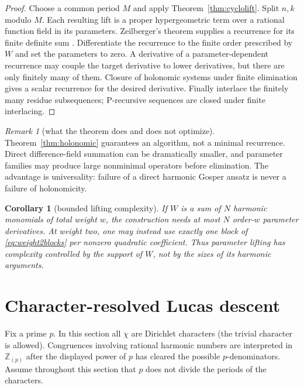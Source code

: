 \documentclass[11pt]{article}
\newtheorem{corollary}[theorem]{Corollary}
\theoremstyle{definition}
\theoremstyle{remark}
\newtheorem{remark}[theorem]{Remark}
\newcommand{\Zp}{\mathbb Z_{(p)}}
\begin{document}
\begin{proof}
Choose a common period $M$ and apply Theorem~\ref{thm:cyclolift}.  Split $n,k$ modulo $M$.
Each resulting lift is a proper hypergeometric term over a rational function field in its
parameters.  Zeilberger's theorem supplies a recurrence for its finite definite sum
\cite{WZ1990,PWZ}.  Differentiate the recurrence to the finite order prescribed by $W$
and set the parameters to zero.  A derivative of a parameter-dependent recurrence may
couple the target derivative to lower derivatives, but there are only finitely many of
them.  Closure of holonomic systems under finite elimination gives a scalar recurrence
for the desired derivative.  Finally interlace the finitely many residue subsequences;
P-recursive sequences are closed under finite interlacing.
\end{proof}

\begin{remark}[what the theorem does and does not optimize]
Theorem~\ref{thm:holonomic} guarantees an algorithm, not a minimal recurrence.  Direct
difference-field summation can be dramatically smaller, and parameter families may
produce large nonminimal operators before elimination.  The advantage is universality:
failure of a direct harmonic Gosper ansatz is never a failure of holonomicity.
\end{remark}

\begin{corollary}[bounded lifting complexity]\label{cor:complexity}
If $W$ is a sum of $N$ harmonic monomials of total weight $w$, the construction needs at
most $N$ order-$w$ parameter derivatives.  At weight two, one may instead use exactly one
block of \eqref{eq:weight2blocks} per nonzero quadratic coefficient.  Thus parameter
lifting has complexity controlled by the support of $W$, not by the sizes of its harmonic
arguments.
\end{corollary}

\section{Character-resolved Lucas descent}

Fix a prime $p$.  In this section all $\chi$ are Dirichlet characters (the trivial
character is allowed).  Congruences involving rational harmonic numbers are interpreted in
$\Zp$ after the displayed power of $p$ has cleared the possible $p$-denominators.  Assume
throughout this section that $p$ does not divide the periods of the characters.
\end{document}
